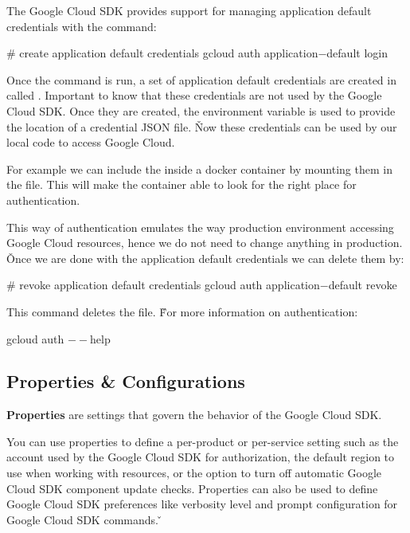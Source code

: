 The Google Cloud SDK provides support for managing application default credentials with the command:
\begin{bash}
# create application default credentials
gcloud auth application$-$default login
\end{bash}

Once the command is run, a set of application default credentials are created in 
called . Important to know that these credentials are not used by the
Google Cloud SDK. Once they are created, the  environment variable is used to
provide the location of a credential JSON file. \v

Now these credentials can be used by our local code to access Google Cloud.

\be
For example we can include the  inside a docker container by mounting them
in the  file. This will make the container able to look for the right place for authentication.
\ee

This way of authentication emulates the way production environment accessing Google Cloud resources, hence we do not
need to change anything in production. \v

Once we are done with the application default credentials we can delete them by:
\begin{bash}
# revoke application default credentials
gcloud auth application$-$default revoke
\end{bash}

This command deletes the  file. \v

For more information on authentication:
\begin{bash}
gcloud auth $--$help
\end{bash}

\subsection{Properties \& Configurations}

\bd[Properties]
\textbf{Properties} are settings that govern the behavior of the Google Cloud SDK.
\ed

You can use properties to define a per-product or per-service setting such as the account used by the Google Cloud SDK 
for authorization, the default region to use when working with resources, or the option to turn off automatic Google 
Cloud SDK component update checks. Properties can also be used to define Google Cloud SDK preferences like verbosity 
level and prompt configuration for Google Cloud SDK commands. \v

